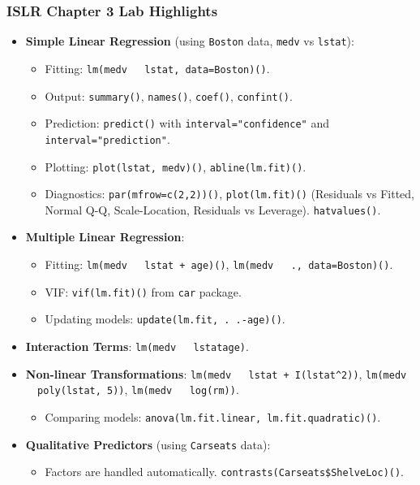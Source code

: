 \documentclass[12pt,a4paper]{article}
\newcommand{\Rpackage}[1]{\texttt{#1}} %
\newcommand{\Rfunction}[1]{\texttt{#1()}} %
\newcommand{\Robject}[1]{\texttt{#1}} %
\newcommand{\Rcode}[1]{\texttt{#1}} %
\begin{document}
\begin{itemize}
    \subsubsection{ISLR Chapter 3 Lab Highlights }
        \begin{itemize}
            \item \textbf{Simple Linear Regression} (using \Robject{Boston} data, \Robject{medv} vs \Robject{lstat}):
                \begin{itemize}
                    \item Fitting: \Rfunction{lm(medv ~ lstat, data=Boston)}.
                    \item Output: \Rfunction{summary}, \Rfunction{names}, \Rfunction{coef}, \Rfunction{confint}.
                    \item Prediction: \Rfunction{predict} with \Rcode{interval="confidence"} and \Rcode{interval="prediction"}.
                    \item Plotting: \Rfunction{plot(lstat, medv)}, \Rfunction{abline(lm.fit)}.
                    \item Diagnostics: \Rfunction{par(mfrow=c(2,2))}, \Rfunction{plot(lm.fit)} (Residuals vs Fitted, Normal Q-Q, Scale-Location, Residuals vs Leverage). \Rfunction{hatvalues}.
                \end{itemize}
            \item \textbf{Multiple Linear Regression}:
                \begin{itemize}
                    \item Fitting: \Rfunction{lm(medv ~ lstat + age)}, \Rfunction{lm(medv ~ ., data=Boston)}.
                    \item VIF: \Rfunction{vif(lm.fit)} from \Rpackage{car} package.
                    \item Updating models: \Rfunction{update(lm.fit, .~.-age)}.
                \end{itemize}
            \item \textbf{Interaction Terms}: \Rcode{lm(medv ~ lstatage)}.
            \item \textbf{Non-linear Transformations}: \Rcode{lm(medv ~ lstat + I(lstat\textasciicircum{}2))}, \Rcode{lm(medv ~ poly(lstat, 5))}, \Rcode{lm(medv ~ log(rm))}.
                \begin{itemize}
                    \item Comparing models: \Rfunction{anova(lm.fit.linear, lm.fit.quadratic)}.
                \end{itemize}
            \item \textbf{Qualitative Predictors} (using \Robject{Carseats} data):
                \begin{itemize}
                    \item Factors are handled automatically. \Rfunction{contrasts(Carseats\$ShelveLoc)}.
                \end{itemize}
        \end{itemize}

\end{itemize}
\end{document}
